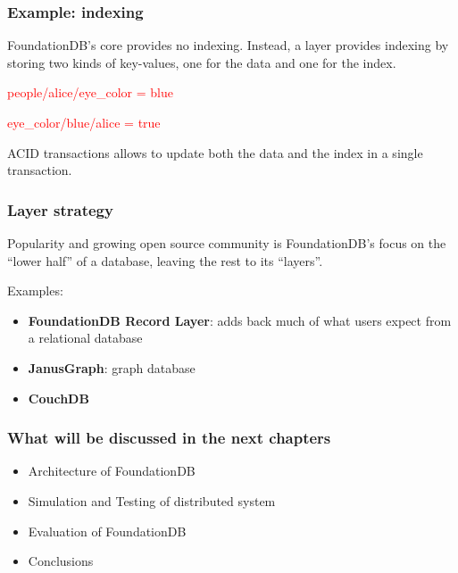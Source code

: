 \begin{frame}
	\frametitle{Example: indexing}

FoundationDB’s core provides no indexing.
Instead, a layer provides indexing by storing two kinds of key-values, one for the data and one for the index.

\begin{center}
\textcolor{red}{people/alice/eye\_color = blue}
\end{center}
\begin{center}
\textcolor{red}{eye\_color/blue/alice = true}
\end{center}

ACID transactions allows to update both the data and the index in a single transaction.
\end{frame}


\begin{frame}
	\frametitle{Layer strategy}

Popularity and growing open source community is FoundationDB’s focus on the “lower
half” of a database, leaving the rest to its “layers”.

Examples:
\begin{itemize}
    \item \textbf{FoundationDB Record Layer}: adds back much of what users expect from a relational database
    \item \textbf{JanusGraph}: graph database
    \item \textbf{CouchDB}
\end{itemize}
\end{frame}



\begin{frame}
	\frametitle{What will be discussed in the next chapters}

    \begin{itemize}
        \item Architecture of FoundationDB
        \item Simulation and Testing of distributed system
        \item Evaluation of FoundationDB
        \item Conclusions
    \end{itemize}
        
\end{frame}


